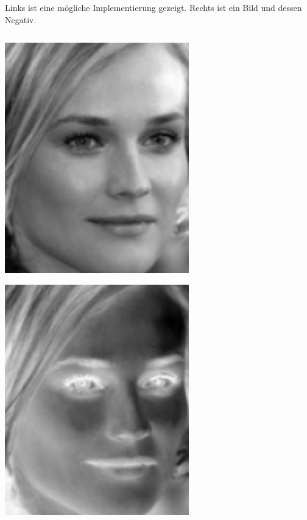 \begin{losung}
	Links ist eine mögliche Implementierung gezeigt.
	Rechts ist ein Bild und dessen Negativ.\\[0.5cm]
	\begin{minipage}{0.45\textwidth}
\inputminted[frame=single,framesep=5pt,firstline=19,lastline=23]{python}{codes/solution/chapter2.py}
	\end{minipage}\hfill
	\begin{minipage}{0.25\textwidth}\vspace{-1cm}
		\centering\includegraphics[width=0.6\textwidth]{images/vectormatrix/Diane_Kruger}
	\end{minipage}
	\begin{minipage}{0.25\textwidth}\vspace{-1cm}
		\centering\includegraphics[width=0.6\textwidth]{images/vectormatrix/Diane_Kruger_negative}
	\end{minipage}
\end{losung}
